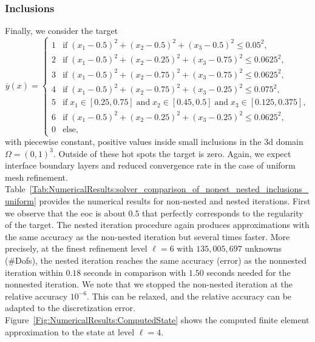\documentclass{article}
\numberwithin{equation}{section}
\begin{document}
\subsubsection{Inclusions}\label{Subsubsection:NumericalResults:Inclusions}
Finally, we consider the  target 
\[
\overline{y}(x) =
\begin{cases}
  1 & \mbox{if}\; (x_1-0.5)^2+(x_2-0.5)^2+(x_3-0.5)^2\leq 0.05^2, \\
  2 & \mbox{if}\; (x_1-0.5)^2+(x_2-0.25)^2+(x_3-0.75)^2\leq 0.0625^2,\\
  3 & \mbox{if}\; (x_1-0.5)^2+(x_2-0.75)^2+(x_3-0.75)^2\leq 0.0625^2,\\
  4 & \mbox{if}\; (x_1-0.5)^2+(x_2-0.75)^2+(x_3-0.25)^2\leq 0.075^2,\\
  5 & \mbox{if}\; x_1\in[0.25, 0.75] \;\mbox{and}\; x_2\in [0.45,0.5]\;\mbox{and}\; x_3\in[0.125, 0.375],\\
  6 & \mbox{if}\; (x_1-0.5)^2+(x_2-0.25)^2+(x_3-0.25)^2\leq 0.0625^2,\\
  0 & \mbox{else},
\end{cases}
\]
with  piecewise constant, positive values inside small inclusions in the
3d domain $\Omega=(0,1)^3$. Outside of these hot spots the target is zero.
Again, we expect interface boundary layers and reduced convergence 
rate in the case of uniform mesh refinement.
Table~\ref{Tab:NumericalResults:solver_comparison_of_nonest_nested_inclusions_uniform} 
provides the numerical results for non-nested and nested iterations. 
First we observe that the eoc is about $0.5$ that perfectly corresponds
to the regularity of the target. The nested iteration procedure again
produces approximations with the same accuracy as the non-nested iteration
but several times faster. More precisely, at the finest refinement
level $\ell = 6$ with $135,005,697$ unknowns ({\#Dofs}),
the nested iteration reaches the same accuracy (error) as the nonnested
iteration within $0.18$ seconds in comparison with $1.50$ seconds needed for
the nonnested iteration.
We note that we stopped the non-nested iteration at the relative accuracy
$10^{-6}$. This can be relaxed, and the relative accuracy can be adapted
to the discretization error.
Figure~\ref{Fig:NumericalResults:ComputedState} shows the computed finite
element approximation to the state at level $\ell= 4$.
\end{document}
